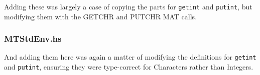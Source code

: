 \documentclass[12pt]{article}
\newcommand{\lstin}[3]{
  
}
\begin{document}
\lstin{169}{179}{LibMT.hs}

Adding these was largely a case of copying the parts for \verb|getint| and \verb|putint|, but modifying them with the GETCHR and PUTCHR MAT calls.

\subsubsection{MTStdEnv.hs}

And adding them here was again a matter of modifying the definitions for \verb|getint| and \verb|putint|, ensuring they were type-correct for Characters rather than Integers.

\lstin{90}{91}{MTStdEnv.hs}
\end{document}
